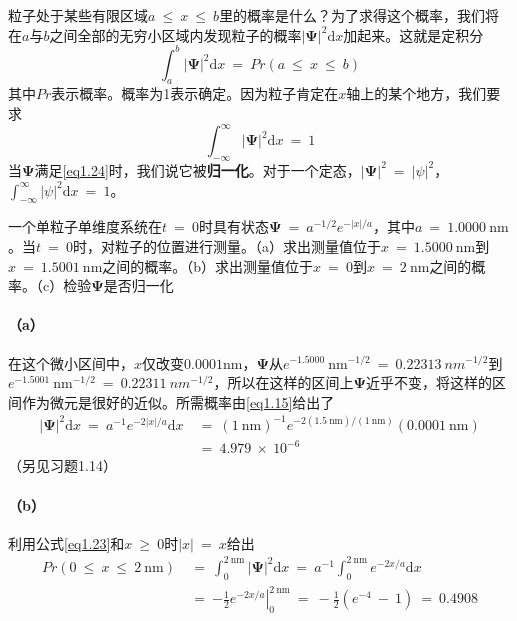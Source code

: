 \documentclass[12pt,a4paper,openany]{ctexbook}
\begin{document}
\begin{flushleft}
粒子处于某些有限区域$a\ \leq\ x\ \leq\ b$里的概率是什么？为了求得这个概率，我们将在$a$与$b$之间全部的无穷小区域内发现粒子的概率$\left|\bm{\Psi}\right|^2\mathrm{d}x$加起来。这就是定积分
\begin{equation}
    \boxed{\int_a^b\left|\bm{\Psi}\right|^2\mathrm{d}x\ =\ Pr(a\ \leq\ x\ \leq\ b)}
    \label{eq1.23}
\end{equation}
其中$Pr$表示概率。概率为1表示确定。因为粒子肯定在$x$轴上的某个地方，我们要求
\begin{equation}
    \boxed{\int_{-\infty}^{\infty}\left|\bm{\Psi}\right|^2\mathrm{d}x\ =\ 1}
    \label{eq1.24}
\end{equation}
当$\bm{\Psi}$满足\eqref{eq1.24}时，我们说它被\textbf{归一化}。对于一个定态，$\left|\bm{\Psi}\right|^2\ =\ \left|\psi\right|^2$，$\int_{-\infty}^{\infty}\left|\psi\right|^2\mathrm{d}x\ =\ 1$。

\begin{examplebox}
一个单粒子单维度系统在$t\ =\ 0$时具有状态$\bm{\Psi}\ =\ a^{-1/2}e^{-\left|x\right|/a}$，其中$a\ =\ 1.0000\ \text{nm}$。当$t\ =\ 0$时，对粒子的位置进行测量。（a）求出测量值位于$x\ =\ 1.5000\ \text{nm}$到$x\ =\ 1.5001\ \text{nm}$之间的概率。（b）求出测量值位于$x\ =\ 0$到$x\ =\ 2\ \text{nm}$之间的概率。（c）检验$\bm{\Psi}$是否归一化

\paragraph{（a）}
在这个微小区间中，$x$仅改变$0.0001 \text{nm}$，$\bm{\Psi}$从$e^{-1.5000}\ \text{nm}^{-1/2}\ =\ 0.22313\ nm^{-1/2}$到$e^{-1.5001}\ \text{nm}^{-1/2}\ =\ 0.22311\ nm^{-1/2}$，所以在这样的区间上$\bm{\Psi}$近乎不变，将这样的区间作为微元是很好的近似。所需概率由\eqref{eq1.15}给出了
\begin{align*}
    \left|\bm{\Psi}\right|^2\mathrm{d}x\ =\ a^{-1}e^{-2\left|x\right|/a}\mathrm{d}x\ &=\ (1\ \text{nm})^{-1}e^{-2(1.5\ \text{nm})/(1\ \text{nm})}(0.0001\ \text{nm}) \\
    &=\ 4.979\ \times\ 10^{-6}
\end{align*}
（另见习题1.14）

\paragraph{（b）}
利用公式\eqref{eq1.23}和$x\ \geq\ 0$时$\left|x\right|\ =\ x$给出
\begin{align*}
    Pr(0\ \leq\ x\ \leq\ 2\ \text{nm})\ &=\ \int_0^{2\ \text{nm}}\left|\bm{\Psi}\right|^2\mathrm{d}x\ =\ a^{-1}\int_0^{2\ \text{nm}}e^{-2x/a}\mathrm{d}x \\
    &=\ \left.-\frac{1}{2}e^{-2x/a}\right|_0^{2\ \text{nm}}\ =\ -\frac{1}{2}(e^{-4}\ -\ 1)\ =\ 0.4908
\end{align*}


\end{examplebox}
\end{flushleft}
\end{document}
